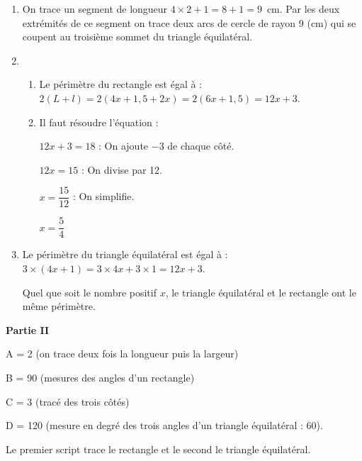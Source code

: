 \documentclass[10pt]{article}
\begin{document}
\begin{enumerate}
\item On trace un segment de longueur $4 \times 2 + 1 = 8 + 1 = 9$~cm. Par les deux extrémités de ce segment on trace deux arcs de cercle de rayon 9 (cm) qui se coupent au troisième sommet du triangle équilatéral.
\item
	\begin{enumerate}
		\item Le périmètre du rectangle est égal à : $2(L + l) = 2(4x + 1,5 + 2x) = 2(6x + 1,5) = 12x + 3$.
		\item Il faut résoudre l'équation : 
        
        $12x + 3 = 18$ : On ajoute $- 3$ de chaque côté.
		
		$12x = 15$ : On divise par 12.
		
		$x = \dfrac{15}{12}$ : On simplifie.
		
		$x = \dfrac{5}{4}$
	\end{enumerate}
\item Le périmètre du triangle équilatéral est égal à : $3 \times (4x + 1) = 3 \times 4x + 3 \times 1 = 12x + 3$.

Quel que soit le nombre positif $x$, le triangle équilatéral et le rectangle ont le même périmètre.
\end{enumerate}

\textbf{Partie II}

A = 2 (on trace deux fois la longueur puis la largeur)

B = 90 (mesures des  angles d'un rectangle)

C = 3 (tracé des trois côtés)

D = 120 (mesure en degré des trois angles d'un triangle équilatéral : 60).

Le premier script trace le rectangle et le second le triangle équilatéral.
\end{document}
